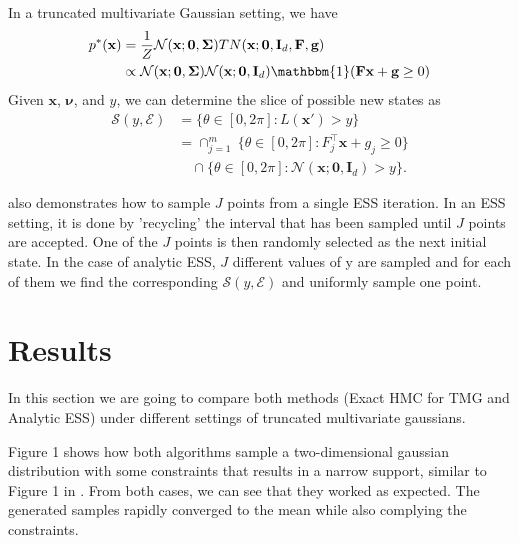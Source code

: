 \documentclass{scrartcl}
\numberwithin{equation}{section}
\begin{document}
In a truncated multivariate Gaussian setting, we have
\begin{equation}\label{eq:tmgESS}
\begin{split}
	p^*(\textbf{x}) &= \frac1Z\mathcal{N}(\textbf{x};\textbf{0}, \boldsymbol{\Sigma}) TN(\textbf{x};\textbf{0},\textbf{I}_d,\textbf{F},\textbf{g}) \\
	&\propto \mathcal{N}(\textbf{x};\textbf{0},\boldsymbol{\Sigma}) \mathcal{N}(\textbf{x};\textbf{0},\textbf{I}_d)\mathbbm{1}(\textbf{F}\textbf{x} + \textbf{g}\geq 0)
\end{split}
\end{equation}
Given $\textbf{x}$, $\boldsymbol{\nu}$, and $y$, we can determine the slice of possible new states as
\begin{equation}\label{eq:exactslice}
\begin{split}
	\mathcal{S}(y,\mathcal{E}) &= \{\theta \in [0,2\pi]:  L(\textbf{x}')>y\} \\
	&= \cap^m_{j=1}\ \{\theta \in [0,2\pi]: F_j^{\intercal}\textbf{x} + g_j \geq0 \} \\
	& \quad \cap\{\theta \in [0,2\pi]: \mathcal{N}(\textbf{x};\textbf{0},\textbf{I}_d)>y\}.
\end{split}
\end{equation}   

\cite{Fagan2016ESSwEP} also demonstrates how to sample $J$ points from a single ESS iteration. In an ESS setting, it is done by 'recycling' the interval that has been sampled until $J$ points are accepted. One of the $J$ points is then randomly selected as the next initial state. In the case of analytic ESS, $J$ different values of y are sampled and for each of them we find the corresponding $\mathcal{S}(y,\mathcal{E})$ and uniformly sample one point.   


\section{Results}
In this section we are going to compare both methods (Exact HMC for TMG and Analytic ESS) under different settings of truncated multivariate gaussians.

Figure 1 shows how both algorithms sample a two-dimensional gaussian distribution with some constraints that results in a narrow support, similar to Figure 1 in \cite{pakman2013exact}. From both cases, we can see that they worked as expected. The generated samples rapidly converged to the mean while also complying the constraints.     
\end{document}
